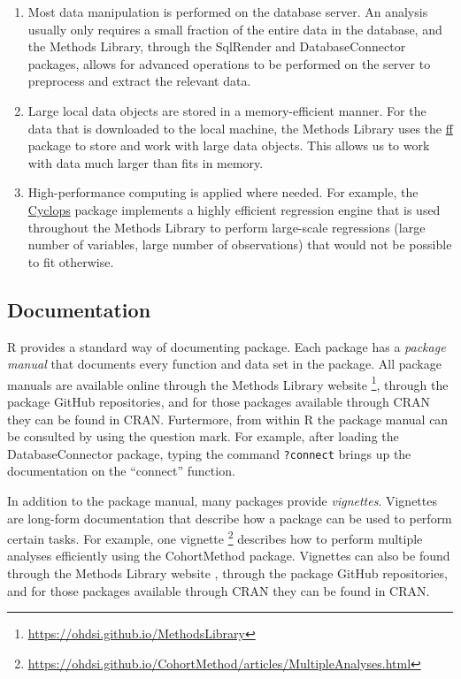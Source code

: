\documentclass[11pt]{book}
\providecommand{\tightlist}{%
  \setlength{\itemsep}{0pt}\setlength{\parskip}{0pt}}
\let\rmarkdownfootnote\footnote%
\def\footnote{\protect\rmarkdownfootnote}
\begin{document}
\begin{enumerate}
\def\labelenumi{\arabic{enumi}.}
\tightlist
\item
  Most data manipulation is performed on the database server. An
  analysis usually only requires a small fraction of the entire data in
  the database, and the Methods Library, through the SqlRender and
  DatabaseConnector packages, allows for advanced operations to be
  performed on the server to preprocess and extract the relevant data.
\item
  Large local data objects are stored in a memory-efficient manner. For
  the data that is downloaded to the local machine, the Methods Library
  uses the \href{https://cran.r-project.org/web/packages/ff}{ff} package
  to store and work with large data objects. This allows us to work with
  data much larger than fits in memory.
\item
  High-performance computing is applied where needed. For example, the
  \href{https://ohdsi.github.io/Cyclops/}{Cyclops} package implements a
  highly efficient regression engine that is used throughout the Methods
  Library to perform large-scale regressions (large number of variables,
  large number of observations) that would not be possible to fit
  otherwise.
\end{enumerate}

\subsection{Documentation}\label{documentation-1}

R provides a standard way of documenting package. Each package has a
\emph{package manual} that documents every function and data set in the
package. All package manuals are available online through the Methods
Library website \footnote{\url{https://ohdsi.github.io/MethodsLibrary}},
through the package GitHub repositories, and for those packages
available through CRAN they can be found in CRAN. Furtermore, from
within R the package manual can be consulted by using the question mark.
For example, after loading the DatabaseConnector package, typing the
command \texttt{?connect} brings up the documentation on the ``connect''
function.

In addition to the package manual, many packages provide
\emph{vignettes}. Vignettes are long-form documentation that describe
how a package can be used to perform certain tasks. For example, one
vignette \footnote{\url{https://ohdsi.github.io/CohortMethod/articles/MultipleAnalyses.html}}
describes how to perform multiple analyses efficiently using the
CohortMethod package. Vignettes can also be found through the Methods
Library website , through the package GitHub repositories, and for those
packages available through CRAN they can be found in CRAN.
\end{document}
